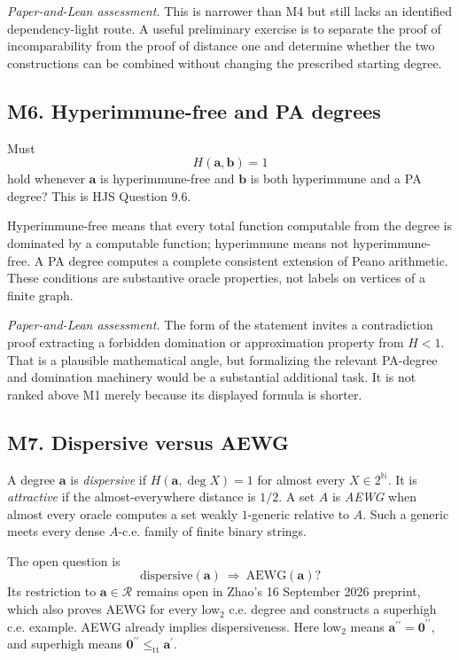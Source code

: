 \documentclass[11pt,a4paper]{article}
\newcommand{\N}{\mathbb N}
\newcommand{\R}{\mathcal R}
\newcommand{\Cantor}{2^{\N}}
\newcommand{\zero}{\mathbf0}
\newcommand{\adeg}{\mathbf a}\newcommand{\bdeg}{\mathbf b}
\newcommand{\assessment}[1]{\par\noindent\textit{Paper-and-Lean assessment.} #1\par}
\theoremstyle{definition}\newtheorem{definition}[theorem]{Definition}
\theoremstyle{remark}\newtheorem{remark}[theorem]{Remark}
\begin{document}
\assessment{This is narrower than M4 but still lacks an identified dependency-light route. A useful preliminary exercise is to separate the proof of incomparability from the proof of distance one and determine whether the two constructions can be combined without changing the prescribed starting degree.}

\subsection{M6. Hyperimmune-free and PA degrees \Lmark}
\label{entry:M6}

Must
\[
 H(\adeg,\bdeg)=1
\]
hold whenever $\adeg$ is hyperimmune-free and $\bdeg$ is both hyperimmune and a PA degree? This is HJS Question 9.6.\cite{HJS}

Hyperimmune-free means that every total function computable from the degree is dominated by a computable function; hyperimmune means not hyperimmune-free. A PA degree computes a complete consistent extension of Peano arithmetic. These conditions are substantive oracle properties, not labels on vertices of a finite graph.

\assessment{The form of the statement invites a contradiction proof extracting a forbidden domination or approximation property from $H<1$. That is a plausible mathematical angle, but formalizing the relevant PA-degree and domination machinery would be a substantial additional task. It is not ranked above M1 merely because its displayed formula is shorter.}

\subsection{M7. Dispersive versus AEWG \Lmark}
\label{entry:M7}
\label{sec:aewg}

A degree $\adeg$ is \emph{dispersive} if $H(\adeg,\deg X)=1$ for almost every $X\in\Cantor$. It is \emph{attractive} if the almost-everywhere distance is $1/2$. A set $A$ is \emph{AEWG} when almost every oracle computes a set weakly $1$-generic relative to $A$. Such a generic meets every dense $A$-c.e. family of finite binary strings.

The open question is
\[
 \text{dispersive}(\adeg)\ \Longrightarrow\ \text{AEWG}(\adeg)?
\]
Its restriction to $\adeg\in\R$ remains open in Zhao's 16 September 2026 preprint, which also proves AEWG for every low$_2$ c.e. degree and constructs a superhigh c.e. example. AEWG already implies dispersiveness. Here low$_2$ means $\adeg^{\prime\prime}=\zero^{\prime\prime}$, and superhigh means $\zero^{\prime\prime}\leq_{\mathrm{tt}}\adeg^{\prime}$.\cite{Zhao}
\end{document}
